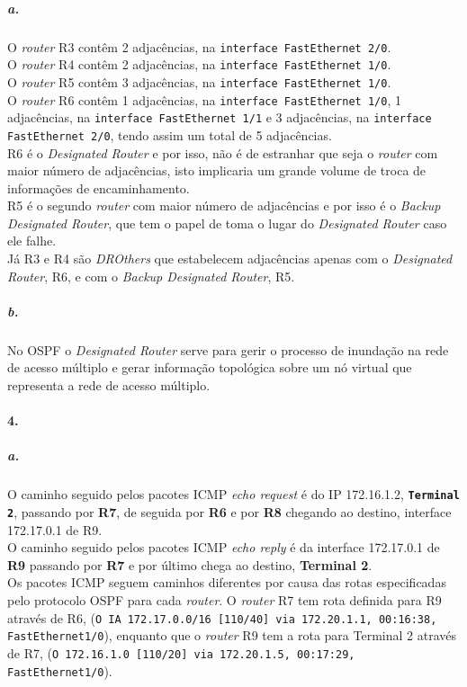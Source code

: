 \subparagraph{a.}
O \emph{router} \textsf{R3} contêm 2 adjacências, na \texttt{interface FastEthernet 2/0}.\\
O \emph{router} \textsf{R4} contêm 2 adjacências, na \texttt{interface FastEthernet 1/0}.\\
O \emph{router} \textsf{R5} contêm 3 adjacências, na \texttt{interface FastEthernet 1/0}.\\
O \emph{router} \textsf{R6} contêm 1 adjacências, na \texttt{interface FastEthernet 1/0}, 1 adjacências, na \texttt{interface FastEthernet 1/1} e 3 adjacências, na \texttt{interface FastEthernet 2/0}, tendo assim um total de 5 adjacências.\\
\textsf{R6} é o \emph{Designated Router} e por isso, não é de estranhar que seja o \emph{router} com maior número de adjacências, isto implicaria um grande volume de troca de informações de encaminhamento.\\
\textsf{R5} é o segundo \emph{router} com maior número de adjacências e por isso é o \emph{Backup Designated Router}, que tem o papel de toma o lugar do \emph{Designated Router} caso ele falhe.\\
Já \textsf{R3} e \textsf{R4} são \emph{DROthers} que estabelecem adjacências apenas com o \emph{Designated Router}, \textsf{R6}, e com o \emph{Backup Designated Router}, \textsf{R5}.

\subparagraph{b.}
No OSPF o \emph{Designated Router} serve para gerir o processo de inundação na rede de acesso múltiplo e gerar informação topológica sobre um nó virtual que representa a rede de acesso múltiplo.

\paragraph{4.}
\subparagraph{a.}
O caminho seguido pelos pacotes ICMP \emph{echo request} é do IP 172.16.1.2, \textbf{\texttt{Terminal 2}}, passando por \textbf{\textsf{R7}}, de seguida por \textbf{\textsf{R6}} e por \textbf{\textsf{R8}} chegando ao destino, interface 172.17.0.1 de \textsf{R9}.\\
O caminho seguido pelos pacotes ICMP \emph{echo reply} é da interface 172.17.0.1 de \textbf{\textsf{R9}} passando por \textbf{\textsf{R7}} e por último chega ao destino, \textbf{\textsf{Terminal 2}}.\\
Os pacotes ICMP seguem caminhos diferentes por causa das rotas especificadas pelo protocolo OSPF para cada \emph{router}. O \emph{router} \textsf{R7} tem rota definida para \textsf{R9} através de \textsf{R6}, (\texttt{O IA 172.17.0.0/16 [110/40] via 172.20.1.1, 00:16:38, FastEthernet1/0}), enquanto que o \emph{router} \textsf{R9} tem a rota para \textsf{Terminal 2} através de \textsf{R7}, (\texttt{O 172.16.1.0 [110/20] via 172.20.1.5, 00:17:29, FastEthernet1/0}).

